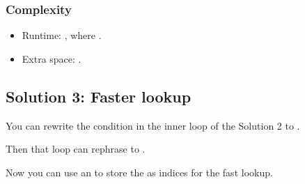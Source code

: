\documentclass[letterpaper,12pt,english]{book}
\begin{document}
\subsubsection{Complexity}
\label{\detokenize{Prefix_Sum/560_Subarray_Sum_Equals_K:id2}}\begin{itemize}
\item {} 
\sphinxAtStartPar
Runtime: , where .

\item {} 
\sphinxAtStartPar
Extra space: .

\end{itemize}


\subsection{Solution 3: Faster lookup}
\label{\detokenize{Prefix_Sum/560_Subarray_Sum_Equals_K:solution-3-faster-lookup}}
\sphinxAtStartPar
You can rewrite the condition  in the inner loop of the Solution 2 to .

\sphinxAtStartPar
Then that loop can rephrase to .

\sphinxAtStartPar
Now you can use an  to store the  as indices for the fast lookup.
\end{document}
